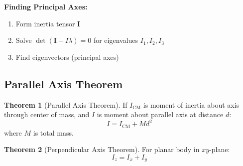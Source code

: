 \documentclass[12pt,a4paper]{article}
\theoremstyle{definition}
\newtheorem{theorem}{Theorem}[section]
\begin{document}
\begin{tipbox}
\textbf{Finding Principal Axes:}
\begin{enumerate}
    \item Form inertia tensor $\mathbf{I}$
    \item Solve $\det(\mathbf{I} - I\lambda) = 0$ for eigenvalues $I_1, I_2, I_3$
    \item Find eigenvectors (principal axes)
\end{enumerate}
\end{tipbox}

\subsection{Parallel Axis Theorem}

\begin{theorem}[Parallel Axis Theorem]
If $I_{\text{CM}}$ is moment of inertia about axis through center of mass, and $I$ is moment about parallel axis at distance $d$:
\[
I = I_{\text{CM}} + Md^2
\]
where $M$ is total mass.
\end{theorem}

\begin{theorem}[Perpendicular Axis Theorem]
For planar body in $xy$-plane:
\[
I_z = I_x + I_y
\]
\end{theorem}
\end{document}
